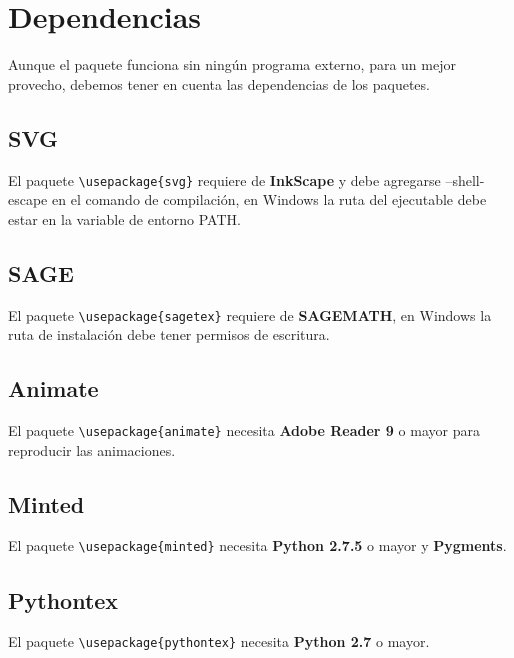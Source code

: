 \chapter{Dependencias}\label{cap:dependencias}
{\justifying
	Aunque el paquete \printproject\space funciona sin ningún programa externo, para un mejor provecho, debemos tener en cuenta las dependencias de los paquetes.
	\section{SVG}\label{sec:DependenciasSVG}
	El paquete \verb|\usepackage{svg}| requiere de \textbf{InkScape} y debe agregarse --shell-escape en el comando de compilación, en Windows la ruta del ejecutable debe estar en la variable de entorno PATH. 
	\section{SAGE}
	El paquete \verb|\usepackage{sagetex}| requiere de \textbf{SAGEMATH}, en Windows la ruta de instalación debe tener permisos de escritura.
	\section{Animate}
	El paquete \verb|\usepackage{animate}| necesita \textbf{Adobe Reader 9} o mayor para reproducir las animaciones.
	\section{Minted}
	El paquete \verb|\usepackage{minted}| necesita \textbf{Python 2.7.5} o mayor y \textbf{Pygments}.
	\section{Pythontex}
	El paquete \verb|\usepackage{pythontex}| necesita \textbf{Python 2.7} o mayor.
}